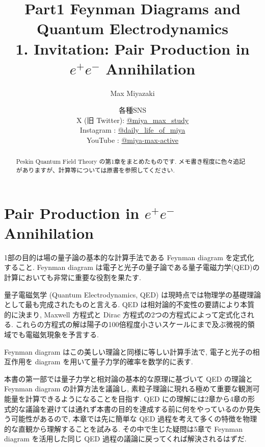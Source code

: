 \documentclass[a4paper,12pt]{article}
\title{Part1 Feynman Diagrams and Quantum Electrodynamics\\
1. Invitation: Pair Production in $e^+ e^-$ Annihilation}
\date{各種SNS\\
    X (旧 Twitter): \href{https://x.com/miya_max_study}{@miya\_max\_study}\\
    Instagram : \href{https://www.instagram.com/daily_life_of_miya/}{@daily\_life\_of\_miya}\\
    YouTube : \href{https://www.youtube.com/@miya-max-active}{@miya-max-active}
    }
\author{Max Miyazaki}
\begin{document}
\maketitle

\vspace{1cm}
\begin{abstract}
    Peskin Quantum Field Theory の第1章をまとめたものです. メモ書き程度に色々追記がありますが、計算等については原書を参照してください.
\end{abstract}


\newpage
\section{\textrm{Pair Production in $e^+ e^-$ Annihilation}}
1部の目的は場の量子論の基本的な計算手法である Feynman diagram を定式化すること. Feynman diagram は電子と光子の量子論である量子電磁力学(QED)の計算においても非常に重要な役割を果たす.\par
量子電磁気学 (Quantum Electrodynamics, QED) は現時点では物理学の基礎理論として最も完成されたものと言える. QED は相対論的不変性の要請により本質的に決まり, Maxwell 方程式と Dirac 方程式の2つの方程式によって定式化される. これらの方程式の解は陽子の100倍程度小さいスケールにまで及ぶ微視的領域でも電磁気現象を予言する.\par
Feynman diagram はこの美しい理論と同様に等しい計算手法で, 電子と光子の相互作用を diagram を用いて量子力学的確率を数学的に表す.\par
本書の第一部では量子力学と相対論の基本的な原理に基づいて QED の理論と Feynman diagram の計算方法を議論し, 素粒子理論に現れる極めて重要な観測可能量を計算できるようになることを目指す. QED にの理解には2章から4章の形式的な議論を避けては通れず本書の目的を達成する前に何をやっているのか見失う可能性があるので, 本章では先に簡単な QED 過程を考えて多くの特徴を物理的な直観から理解することを試みる. その中で生じた疑問は5章で Feynman diagram を活用した同じ QED 過程の議論に戻ってくれば解決されるはずだ.
\end{document}
